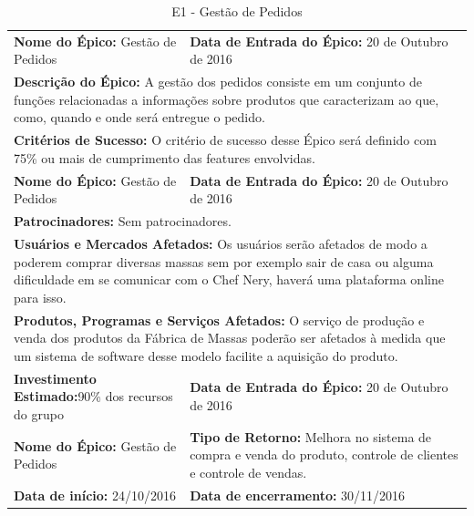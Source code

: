 \begin{table}[]
\centering
\caption{E1 - Gestão de Pedidos}
\label{my-label}
\begin{tabular}{|p{7cm}|p{8cm}|}
\cline{1-2}
\textbf{Nome do Épico:} Gestão de Pedidos &  \textbf{Data de Entrada do Épico:} 20 de Outubro de 2016\\ \cline{1-2}
\multicolumn{2}{|p{15cm}|}{ \textbf{Descrição do Épico:} A gestão dos pedidos consiste em um conjunto de funções relacionadas  a informações sobre produtos que caracterizam ao que, como, quando e onde será entregue o pedido.} \\ \cline{1-2}
\multicolumn{2}{|p{15cm}|}{\textbf{Critérios de Sucesso:} O critério de sucesso desse Épico será definido com 75\% ou mais de cumprimento das features envolvidas.} \\ \cline{1-2}
\textbf{Nome do Épico:} Gestão de Pedidos &  \textbf{Data de Entrada do Épico:} 20 de Outubro de 2016\\ \cline{1-2}
\multicolumn{2}{|p{15cm}|}{ \textbf{Patrocinadores:} Sem patrocinadores.} \\ \cline{1-2}
\multicolumn{2}{|p{15cm}|}{ \textbf{Usuários e Mercados Afetados:} Os usuários serão afetados de modo a poderem comprar diversas massas sem por exemplo sair de casa ou alguma dificuldade em se comunicar com o Chef Nery, haverá uma plataforma online para isso.} \\ \cline{1-2}
\multicolumn{2}{|p{15cm}|}{ \textbf{Produtos, Programas e Serviços Afetados:} O serviço de produção e venda dos produtos da Fábrica de Massas poderão ser afetados à medida que um sistema de software desse modelo facilite a aquisição do produto. } \\ \cline{1-2}
\textbf{Investimento Estimado:}90\% dos recursos do grupo &  \textbf{Data de Entrada do Épico:} 20 de Outubro de 2016\\ \cline{1-2}
\textbf{Nome do Épico:} Gestão de Pedidos & \textbf{Tipo de Retorno:} Melhora no sistema de compra e venda do produto, controle de clientes e controle de vendas.\\ \cline{1-2}
\textbf{Data de início:} 24/10/2016 & \textbf{Data de encerramento:} 30/11/2016\\ \cline{1-2}
\end{tabular}
\end{table}

\tab \\ \\ \\ 

